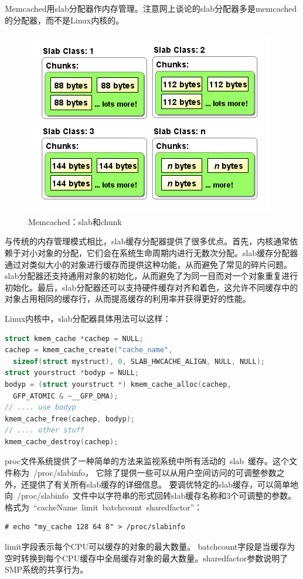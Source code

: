 Memcached用slab分配器作内存管理。注意网上谈论的slab分配器多是memcached的分配器，而不是Linux内核的。
\begin{figure}[ht]
	\begin{center}
		\includegraphics[keepaspectratio,width=0.3\paperwidth]{Pictures/Kernel/slabAndChunk.png}
	\caption{Memcached：slab和chunk}
	\label{fig:slabAndChunk}
	\end{center}
\end{figure}




与传统的内存管理模式相比，slab缓存分配器提供了很多优点。首先，内核通常依赖于对小对象的分配，它们会在系统生命周期内进行无数次分配。slab缓存分配器通过对类似大小的对象进行缓存而提供这种功能，从而避免了常见的碎片问题。slab分配器还支持通用对象的初始化，从而避免了为同一目而对一个对象重复进行初始化。最后，slab分配器还可以支持硬件缓存对齐和着色，这允许不同缓存中的对象占用相同的缓存行，从而提高缓存的利用率并获得更好的性能。


Linux内核中，slab分配器具体用法可以这样：
\begin{lstlisting}[language=C++]
struct kmem_cache *cachep = NULL;
cachep = kmem_cache_create("cache_name", 
  sizeof(struct mystruct), 0, SLAB_HWCACHE_ALIGN, NULL, NULL);
struct yourstruct *bodyp = NULL;
bodyp = (struct yourstruct *) kmem_cache_alloc(cachep, 
  GFP_ATOMIC & ~__GFP_DMA);
// .... use bodyp
kmem_cache_free(cachep, bodyp);
// .... other stuff
kmem_cache_destroy(cachep);
\end{lstlisting}


proc文件系统提供了一种简单的方法来监视系统中所有活动的 slab 缓存。这个文件称为 /proc/slabinfo，
它除了提供一些可以从用户空间访问的可调整参数之外，还提供了有关所有slab缓存的详细信息。
要调优特定的slab缓存，可以简单地向 /proc/slabinfo 文件中以字符串的形式回转slab缓存名称和3个可调整的参数。
格式为 “cacheName limit batchcount sharedfactor”：
\begin{verbatim}
# echo "my_cache 128 64 8" > /proc/slabinfo
\end{verbatim}
limit字段表示每个CPU可以缓存的对象的最大数量。
batchcount字段是当缓存为空时转换到每个CPU缓存中全局缓存对象的最大数量。sharedfactor参数说明了SMP系统的共享行为。





